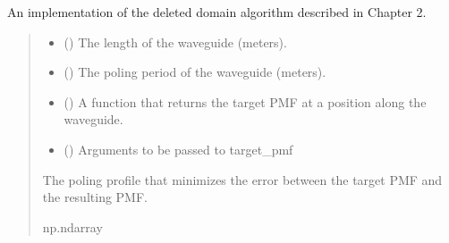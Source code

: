 \documentclass[a4paper,10pt,english]{sphinxmanual}
\begin{document}
\begin{fulllineitems}
\label{\detokenize{waveguide:pyjsa.waveguide.find_poling_profile}}
\pysigstartsignatures
{}
\pysigstopsignatures
\sphinxAtStartPar
An implementation of the deleted domain algorithm described in Chapter 2.
\begin{quote}\begin{description}
\begin{itemize}
\item {} 
\sphinxAtStartPar
{} () \textendash{} The length of the waveguide (meters).

\item {} 
\sphinxAtStartPar
{} () \textendash{} The poling period of the waveguide (meters).

\item {} 
\sphinxAtStartPar
{} () \textendash{} A function that returns the target PMF at a position along the waveguide.

\item {} 
\sphinxAtStartPar
{} () \textendash{} Arguments to be passed to target\_pmf

\end{itemize}

\sphinxAtStartPar
The poling profile that minimizes the error between the target PMF and the resulting PMF.

\sphinxAtStartPar
np.ndarray

\end{description}\end{quote}

\end{fulllineitems}

\end{document}
